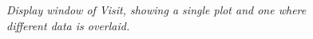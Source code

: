 \documentclass{article}
\begin{document}
\begin{figure}[tbp]
  \phantom{.}
  \hfill
  \hfill
  \hfill
  \phantom{.}
  \caption{\it Display window of Visit, showing a single plot and one where
    different data is overlaid.}
  \label{fig:visit-2}
\end{figure}
\end{document}
